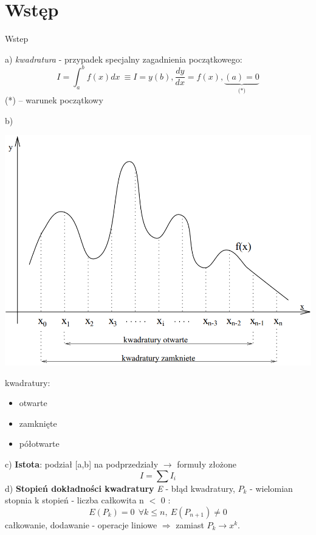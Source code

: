 \section{Wstęp}
	\begin{frame}{Wstep} 
    
a) \textit {kwadratura} - przypadek specjalny zagadnienia początkowego:
$$
 I=\int_{a}^{b}f(x)dx\ \equiv I=y(b), \displaystyle \frac{dy}{dx}=f(x) , \underbrace{(a)=0}_\text{(*)}
$$
(*) -- warunek początkowy
	\end{frame}
    \begin{frame}
    
      b)
      \begin{center}
      	\includegraphics[width=0.6\linewidth]{img/6/image001.png}
      \end{center}
      
      \begin{block}{}
      kwadratury:
      
        \begin{itemize}
          \item otwarte
          \item zamknięte
          \item półotwarte
        \end{itemize}
      \end{block}
    \end{frame}
    \begin{frame}
    	c) \textbf{Istota}: podział [a,b] na podprzedziały $\rightarrow$ formuły złożone
        $$
	        I=\sum I_{i}
        $$
		d) \textbf{Stopień dokładności kwadratury} \newline
        \textit{E} - błąd kwadratury, {$P_{k}$} - wielomian stopnia k \newline
        stopień - liczba całkowita n $<$ 0 :
        $$
			E(P_{k})=0  \ \ \forall k\leq n,\ E(P_{n+1})\neq 0
		$$
        całkowanie, dodawanie - operacje liniowe $\Rightarrow$ zamiast $P_{k}$$\rightarrow x^{k}.$
    \end{frame}
